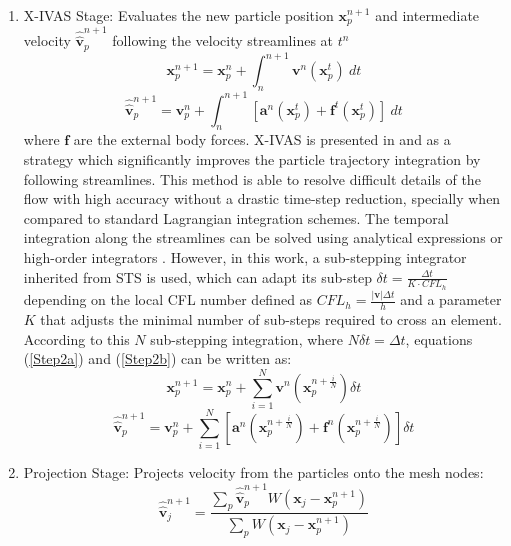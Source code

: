 \begin{enumerate}
\begin{enumerate}
    \item X-IVAS Stage: Evaluates the new particle position $\mathbf{x}^{n+1}_{p}$ and intermediate velocity $\widehat{\widehat{\mathbf{v}}}^{n+1}_{p}$ following the velocity streamlines at $t^n$
      \begin{equation}\label{Step2a}
      \mathbf{x}^{n+1}_{p}=\mathbf{x}^{n}_{p} + \int_{n}^{n+1} \mathbf{v}^{n}(\mathbf{x}_p^{t}) \ dt
      \end{equation}
      \begin{equation}\label{Step2b}
      \displaystyle \widehat{\widehat{\mathbf{v}}}^{n+1}_{p}=\mathbf{v}^{n}_{p} +
      \int_{n}^{n+1} \left[ \mathbf{a}^{n}(\mathbf{x}_p^{t}) + \mathbf{f}^{t} (\mathbf{x}_p^{t}) \right]
      \ dt
      \end{equation}
      where $\mathbf{f}$ are the external body forces. X-IVAS is presented in \cite{Idelsohn12} and \cite{Idelsohn12b} as a strategy which significantly improves the particle trajectory integration by following streamlines. This method is able to resolve difficult details of the flow with high accuracy without a drastic time-step reduction, specially when compared to standard Lagrangian integration schemes. The temporal integration along the streamlines can be solved using analytical expressions \cite{Idelsohn12} or high-order integrators \cite{Nair2003275}. However, in this work, a sub-stepping integrator inherited from STS \cite{Alexiades96} is used, which can adapt its sub-step $\delta t=\frac{\Delta t}{K\cdot CFL_h}$ depending on the local CFL number defined as $CFL_h=\frac{|\mathbf{v}|\Delta t}{h}$ and a parameter $K$ that adjusts the minimal number of sub-steps required to cross an element. According to this $N$ sub-stepping integration, where $N\delta t=\Delta t$, equations (\ref{Step2a}) and (\ref{Step2b}) can be written as:
      \begin{equation}\label{Step2astep}
      \mathbf{x}^{n+1}_{p}=\mathbf{x}^{n}_{p} + \sum_{i=1}^{N} \mathbf{v}^{n}(\mathbf{x}^{n+\frac{i}{N}}_{p}) \delta t
      \end{equation}
      \begin{equation}\label{Step2bstep}
      \widehat{\widehat{\mathbf{v}}}^{n+1}_{p}=\mathbf{v}^{n}_{p} + \sum_{i=1}^{N} \left[\mathbf{a}^{n}(\mathbf{x}^{n+\frac{i}{N}}_{p}) + \mathbf{f}^{n} (\mathbf{x}^{n+\frac{i}{N}}_{p})\right]  \delta t
      \end{equation}

    \item Projection Stage: Projects velocity from the particles onto the mesh nodes:
      \begin{equation}\label{Step3a}
      \widehat{\widehat{\mathbf{v}}}^{n+1}_{j}=\dfrac{\displaystyle \sum_{p} \widehat{\widehat{\mathbf{v}}}^{n+1}_{p} W(\mathbf{x}_{j}-\mathbf{x}_{p}^{n+1})}{\displaystyle \sum_{p} W(\mathbf{x}_{j}-\mathbf{x}_{p}^{n+1})}
      \end{equation}


\end{enumerate}
\end{enumerate}
